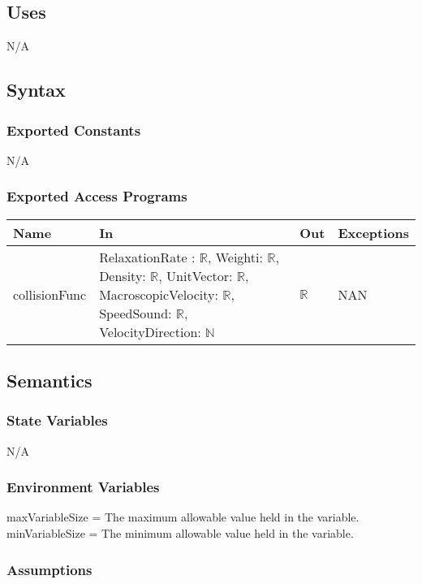 \documentclass[12pt, titlepage]{article}
\begin{document}
\subsection{Uses}
N/A

\subsection{Syntax}

\subsubsection{Exported Constants}
N/A

\subsubsection{Exported Access Programs}

\begin{center}
	\begin{tabular}{p{3cm} p{3cm} p{3cm} p{2cm}}
		\hline
		\textbf{Name} & \textbf{In} & \textbf{Out} & \textbf{Exceptions} \\
		\hline
		collisionFunc & RelaxationRate : $\mathbb{R}$, Weighti: $\mathbb{R}$, Density: $\mathbb{R}$, UnitVector: $\mathbb{R}$, MacroscopicVelocity: $\mathbb{R}$, SpeedSound: $\mathbb{R}$, VelocityDirection: $\mathbb{N}$ & $\mathbb{R}$ & NAN \\
		\hline
	\end{tabular}
\end{center}

\subsection{Semantics}

\subsubsection{State Variables}
N/A

\subsubsection{Environment Variables}
maxVariableSize = The maximum allowable value held in the variable.\\
minVariableSize = The minimum allowable value held in the variable.

\subsubsection{Assumptions}
\end{document}
